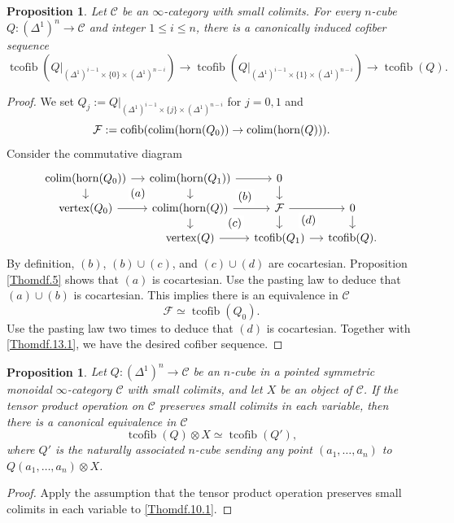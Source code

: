 \documentclass[11pt, a4paper]{amsart}
\newtheorem{prop}[thm]{Proposition}
\theoremstyle{definition}
\numberwithin{equation}{subsection}
\newcommand{\colimit}{\mathop{\rm colim}}
\newcommand{\cC}{\mathcal{C}}
\newcommand{\cF}{\mathcal{F}}
\newcommand{\cofib}{\operatorname{cofib}}
\newcommand{\tcofib}{\operatorname{tcofib}}
\newcommand{\horn}{\mathrm{horn}}
\newcommand{\vertex}{\mathrm{vertex}}
\begin{document}
\begin{prop}
\label{Thomdf.13}
Let $\cC$ be an $\infty$-category with small colimits.
For every $n$-cube $Q\colon (\Delta^1)^n\to \cC$ and integer $1\leq i\leq n$, 
there is a canonically induced cofiber sequence
\begin{equation}
\label{Thomdf.5.3}
\tcofib (Q|_{(\Delta^1)^{i-1}\times \{0\}\times (\Delta^1)^{n-i}})
\to
\tcofib (Q|_{(\Delta^1)^{i-1}\times \{1\}\times (\Delta^1)^{n-i}})
\to
\tcofib(Q).
\end{equation}
\end{prop}
\begin{proof}
We set $Q_j:=Q|_{(\Delta^1)^{i-1}\times \{j\}\times (\Delta^1)^{n-i}}$ for $j=0,1$ and
\[
\cF:=\cofib(\colimit(\horn(Q_0))\to \colimit(\horn(Q))).
\]
Consider the commutative diagram
\[
\begin{tikzcd}[column sep=small, row sep=small]
\colimit(\horn(Q_0))\ar[r]\ar[d]\ar[rd,phantom,"(a)" description]&
\colimit(\horn(Q_1))\ar[d]\ar[r]\ar[rd,phantom,"(b)" description]&
0\ar[d]
\\
\vertex(Q_0)\ar[r]&
\colimit(\horn(Q))\ar[d]\ar[r]\ar[rd,phantom,"(c)" description]&
\cF\ar[d]\ar[r]\ar[rd,phantom,"(d)" description]&
0\ar[d]
\\
&
\vertex(Q)\ar[r]&
\tcofib(Q_1)\ar[r]&
\tcofib(Q).
\end{tikzcd}
\]
By definition, $(b)$, $(b)\cup (c)$, and $(c)\cup (d)$ are cocartesian.
Proposition \ref{Thomdf.5} shows that $(a)$ is cocartesian.
Use the pasting law to deduce that $(a)\cup (b)$ is cocartesian.
This implies there is an equivalence in $\cC$
\begin{equation}
\label{Thomdf.13.1}
\cF
\simeq
\tcofib(Q_0).
\end{equation}
Use the pasting law two times to deduce that $(d)$ is cocartesian.
Together with \eqref{Thomdf.13.1}, we have the desired cofiber sequence.
\end{proof}


\begin{prop}
\label{Thomdf.12}
Let $Q\colon (\Delta^1)^n \to \cC$ be an $n$-cube in a pointed symmetric monoidal $\infty$-category $\cC$ with small colimits, 
and let $X$ be an object of $\cC$.
If the tensor product operation on $\cC$ preserves small colimits in each variable, then there is a canonical equivalence in $\cC$
\[
\tcofib(Q)\otimes X
\simeq
\tcofib(Q'),
\]
where $Q'$ is the naturally associated $n$-cube sending any point $(a_1,\ldots,a_n)$ to $Q(a_1,\ldots,a_n)\otimes X$.
\end{prop}
\begin{proof}
Apply the assumption that the tensor product operation preserves small colimits in each variable to \eqref{Thomdf.10.1}.
\end{proof}
\end{document}

